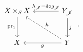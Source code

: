 \[
\begin{tikzcd}[column sep=large,row sep=large]
  X\times_S X
    \arrow[d,"\operatorname{pr}_1"']
  &
  Y_{\mathscr J}
    \arrow[l,
      "h_{\mathscr J}=\delta\circ g_{\mathscr J}"']
    \arrow[d,"j"]
  \\
  X
  &
  Y
    \arrow[l,"g"]
    \arrow[ul,dashed,"h"']%
\end{tikzcd}
\,.
\]
